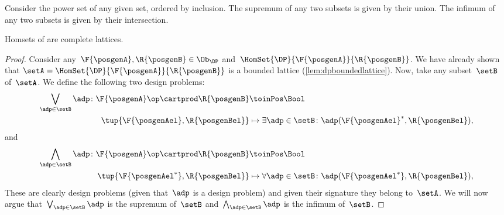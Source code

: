 \begin{example}
    Consider the power set of any given set, ordered by inclusion.
    The supremum of any two subsets is given by their union.
    The infimum of any two subsets is given by their intersection.
\end{example}

\begin{lemma}
    \label{lem:DP-homsets-complete-lattice}
    Homsets of \DP are complete lattices.
\end{lemma}

\begin{proof}
    Consider any~$\F{\posgenA},\R{\posgenB}\in \Ob_\DP$ and~$\HomSet{\DP}{\F{\posgenA}}{\R{\posgenB}}$.
    We have already shown that $\setA=\HomSet{\DP}{\F{\posgenA}}{\R{\posgenB}}$ is a bounded lattice (\cref{lem:dpboundedlattice}).
    Now, take any subset~$\setB$ of~$\setA$.
    We define the following two design problems:
    \begin{equation*}
        \begin{aligned}
            \bigvee_{\adp \in \setB} \adp\colon \F{\posgenA}\op \cartprod \R{\posgenB} & \toinPos \Bool                                                             \\
            \tup{\F{\posgenAel},\R{\posgenBel}}                                        & \mapsto \exists \adp\in \setB\colon \adp(\F{\posgenAel}^*,\R{\posgenBel}),
        \end{aligned}
    \end{equation*}
    and
    \begin{equation*}
        \begin{aligned}
            \bigwedge_{\adp \in \setB} \adp\colon \F{\posgenA}\op \cartprod \R{\posgenB} & \toinPos \Bool                                                             \\
            \tup{\F{\posgenAel^*},\R{\posgenBel}}                                        & \mapsto \forall \adp\in \setB\colon \adp(\F{\posgenAel^*},\R{\posgenBel}),
        \end{aligned}
    \end{equation*}
    These are clearly design problems (given that~$\adp$ is a design problem) and given their signature they belong to~$\setA$.
    We will now argue that~$\bigvee_{\adp \in \setB} \adp$ is the supremum of~$\setB$ and~$\bigwedge_{\adp \in \setB} \adp$ is the infimum of~$\setB$.

\end{proof}
